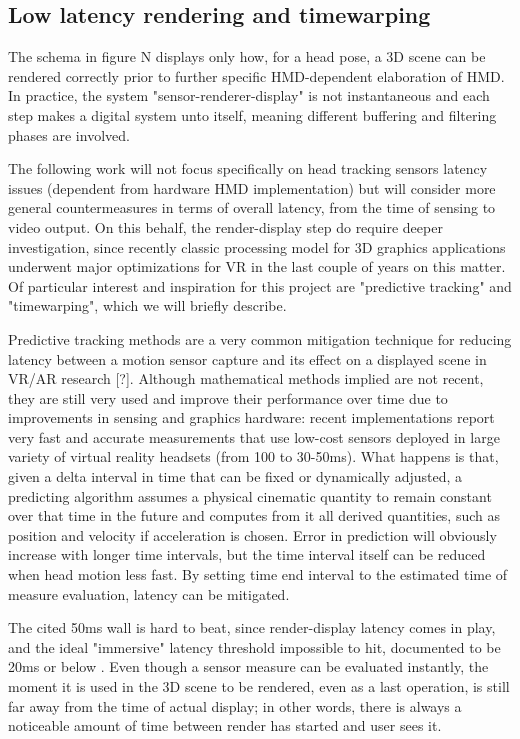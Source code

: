 \subsection{Low latency rendering and timewarping}
The schema in figure N displays only how, for a head pose, a 3D scene can be rendered correctly prior to further specific HMD-dependent elaboration of HMD. In practice, the system "sensor-renderer-display" is not instantaneous and each step makes a digital system unto itself, meaning different buffering and filtering phases are involved.

The following work will not focus specifically on head tracking sensors latency issues (dependent from hardware HMD implementation) but will consider more general countermeasures in terms of overall latency, from the time of sensing to video output. On this behalf, the render-display step do require deeper investigation, since recently classic processing model for 3D graphics applications underwent major optimizations for VR in the last couple of years on this matter. Of particular interest and inspiration for this project are "predictive tracking" and "timewarping", which we will briefly describe.

Predictive tracking methods are a very common mitigation technique for reducing latency between a motion sensor capture and its effect on a displayed scene in VR/AR research [?]. Although mathematical methods implied are not recent, they are still very used and improve their performance over time due to improvements in sensing and graphics hardware: recent implementations report very fast and accurate measurements that use low-cost sensors deployed in large variety of virtual reality headsets (from 100 to 30-50ms)\cite{oculus_prediction}. What happens is that, given a delta interval in time that can be fixed or dynamically adjusted, a predicting algorithm assumes a physical cinematic quantity to remain constant over that time in the future and computes from it all derived quantities, such as position and velocity if acceleration is chosen. Error in prediction will obviously increase with longer time intervals, but the time interval itself can be reduced when head motion less fast. By setting time end interval to the estimated time of measure evaluation, latency can be mitigated.

The cited 50ms wall is hard to beat, since render-display latency comes in play, and the ideal "immersive" latency threshold impossible to hit, documented to be 20ms or below \cite{latency_sinequanon}. Even though a sensor measure can be evaluated instantly, the moment it is used in the 3D scene to be rendered, even as a last operation, is still far away from the time of actual display; in other words, there is always a noticeable amount of time between render has started and user sees it.

